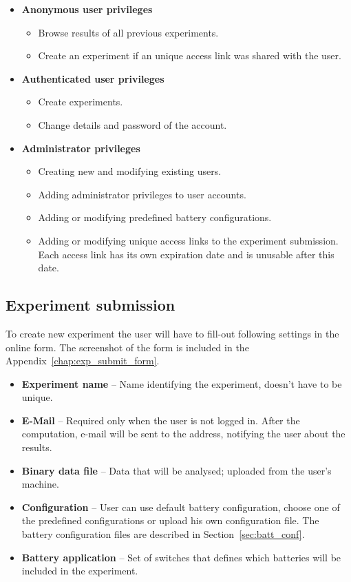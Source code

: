 \documentclass[
  digital,  	%
  color,		%
  oneside,   	%
  12pt,
  nocover,
  notable,
  nolof,
  nolot,
]{fithesis3}
\theoremstyle{definition}
\theoremstyle{remark}
\begin{document}
\begin{itemize}
\item \textbf{Anonymous user privileges}
\begin{itemize}
\item Browse results of all previous experiments.
\item Create an experiment if an unique access link was shared with the user.
\end{itemize}
\item \textbf{Authenticated user privileges}
\begin{itemize}
\item Create experiments.
\item Change details and password of the account.
\end{itemize}
\item \textbf{Administrator privileges}
\begin{itemize}
\item Creating new and modifying existing users.
\item Adding administrator privileges to user accounts.
\item Adding or modifying predefined battery configurations.
\item Adding or modifying unique access links to the experiment submission. Each access link has its own expiration date and is unusable after this date.
\end{itemize}
\end{itemize}

\subsection*{Experiment submission}
To create new experiment the user  will have to fill-out following settings in the online form. The screenshot of the form is included in the Appendix~\ref{chap:exp_submit_form}.

\begin{itemize}
\item \textbf{Experiment name} -- Name identifying the experiment, doesn't have to be unique.
\item \textbf{E-Mail} -- Required only when the user is not logged in. After the computation, e-mail will be sent to the address, notifying the user about the results.
\item \textbf{Binary data file} -- Data that will be analysed; uploaded from the user's machine.
\item \textbf{Configuration} -- User can use default battery configuration, choose one of the predefined configurations or upload his own configuration file. The battery configuration files are described in Section~\ref{sec:batt_conf}.
\item \textbf{Battery application} -- Set of switches that defines which batteries will be included in the experiment.
\end{itemize}
\end{document}
